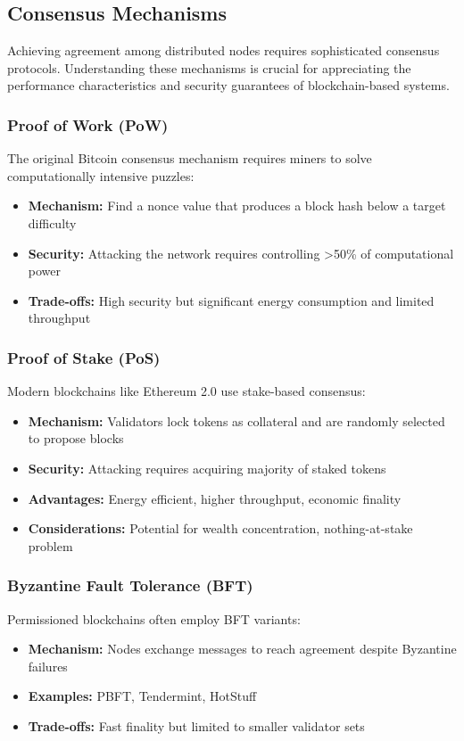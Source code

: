 \subsection{Consensus Mechanisms}

Achieving agreement among distributed nodes requires sophisticated consensus protocols. Understanding these mechanisms is crucial for appreciating the performance characteristics and security guarantees of blockchain-based systems.

\subsubsection{Proof of Work (PoW)}
The original Bitcoin consensus mechanism requires miners to solve computationally intensive puzzles:
\begin{itemize}
    \item \textbf{Mechanism:} Find a nonce value that produces a block hash below a target difficulty
    \item \textbf{Security:} Attacking the network requires controlling >50\% of computational power
    \item \textbf{Trade-offs:} High security but significant energy consumption and limited throughput
\end{itemize}

\subsubsection{Proof of Stake (PoS)}
Modern blockchains like Ethereum 2.0 use stake-based consensus:
\begin{itemize}
    \item \textbf{Mechanism:} Validators lock tokens as collateral and are randomly selected to propose blocks
    \item \textbf{Security:} Attacking requires acquiring majority of staked tokens
    \item \textbf{Advantages:} Energy efficient, higher throughput, economic finality
    \item \textbf{Considerations:} Potential for wealth concentration, nothing-at-stake problem
\end{itemize}

\subsubsection{Byzantine Fault Tolerance (BFT)}
Permissioned blockchains often employ BFT variants:
\begin{itemize}
    \item \textbf{Mechanism:} Nodes exchange messages to reach agreement despite Byzantine failures
    \item \textbf{Examples:} PBFT, Tendermint, HotStuff
    \item \textbf{Trade-offs:} Fast finality but limited to smaller validator sets
\end{itemize}

